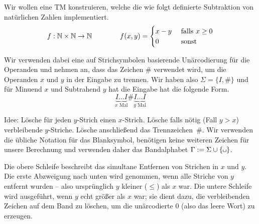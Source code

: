\begin{Bsp}
Wir wollen eine \ac{TM} konstruieren, welche die wie folgt definierte Subtraktion von natürlichen Zahlen implementiert.
% 
% 
$$
f: \mathbb{N}\times\mathbb{N}\rightarrow \mathbb{N}
\qquad \qquad
f(x,y)=
\begin{cases}
 x - y & \text{ falls } x\geq 0\\
 0  & \text{ sonst}
\end{cases}
$$

Wir verwenden dabei eine auf Strichsymbolen basierende Unärcodierung für die Operanden
und nehmen an, dass das Zeichen $\#$ verwendet wird, um die Operanden $x$ und $y$ in der Eingabe zu trennen.
Wir haben also $\Sigma=\{I,\#\}$ und für Minuend $x$ und Subtrahend $y$ hat die Eingabe hat die folgende Form. 
$$\underbrace{I\ldots I}_{x\text{ Mal}}\#\underbrace{I\ldots I}_{y\text{ Mal}}$$


Idee: Lösche für jeden $y$-Strich einen $x$-Strich.
Lösche falls nötig (Fall $y>x$) verbleibende $y$-Striche. Lösche anschließend das Trennzeichen~$\#$.
Wir verwenden die übliche Notation für das Blanksymbol, 
benötigen keine weiteren Zeichen für unsere Berechnung und verwenden daher das Bandalphabet $\Gamma:=\Sigma\cup\{\mblank\}$.

  \begin{center}
  \end{center}
  
  Die obere Schleife beschreibt das simultane Entfernen von Strichen in $x$ und $y$.
  Die erste Abzweigung nach unten wird genommen, wenn alle Striche von $y$ entfernt wurden -- also ursprünglich $y$ kleiner ($\leq$) als $x$ war.
  Die untere Schleife wird ausgeführt, wenn $y$ echt größer als $x$ war; sie dient dazu, die verbleibenden Zeichen auf dem Band zu löschen,
  um die unärcodierte $0$ (also das leere Wort) zu erzeugen.
\end{Bsp}
  
